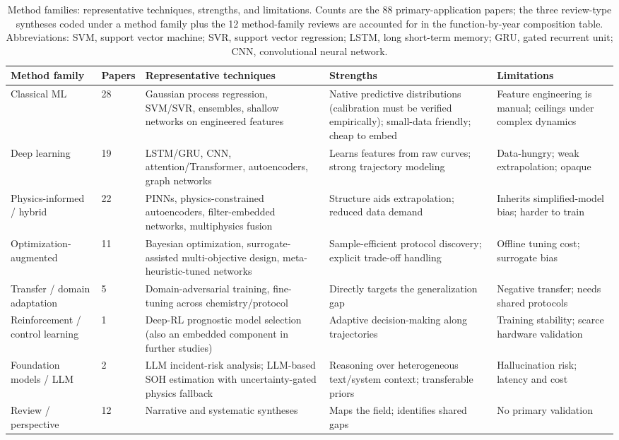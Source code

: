\documentclass[journal]{IEEEtran}
\begin{document}
\begin{table}[!t]
\caption{Method families: representative techniques, strengths, and limitations. Counts are the 88 primary-application papers; the three review-type syntheses coded under a method family plus the 12 method-family reviews are accounted for in the function-by-year composition table. Abbreviations: SVM, support vector machine; SVR, support vector regression; LSTM, long short-term memory; GRU, gated recurrent unit; CNN, convolutional neural network.}
\label{tab:TABLE_METH}
\centering
\footnotesize
\begin{tabular}{|p{0.76in}|p{0.37in}|p{1.90in}|p{1.90in}|p{1.47in}|}
\hline
\textbf{Method family} & \textbf{Papers} & \textbf{Representative techniques} & \textbf{Strengths} & \textbf{Limitations} \\
\hline
Classical ML & 28 & Gaussian process regression, SVM/SVR, ensembles, shallow networks on engineered features & Native predictive distributions (calibration must be verified empirically); small-data friendly; cheap to embed & Feature engineering is manual; ceilings under complex dynamics \\
Deep learning & 19 & LSTM/GRU, CNN, attention/Transformer, autoencoders, graph networks & Learns features from raw curves; strong trajectory modeling & Data-hungry; weak extrapolation; opaque \\
Physics-informed / hybrid & 22 & PINNs, physics-constrained autoencoders, filter-embedded networks, multiphysics fusion & Structure aids extrapolation; reduced data demand & Inherits simplified-model bias; harder to train \\
Optimization-augmented & 11 & Bayesian optimization, surrogate-assisted multi-objective design, meta-heuristic-tuned networks & Sample-efficient protocol discovery; explicit trade-off handling & Offline tuning cost; surrogate bias \\
Transfer / domain adaptation & 5 & Domain-adversarial training, fine-tuning across chemistry/protocol & Directly targets the generalization gap & Negative transfer; needs shared protocols \\
Reinforcement / control learning & 1 & Deep-RL prognostic model selection (also an embedded component in further studies) & Adaptive decision-making along trajectories & Training stability; scarce hardware validation \\
Foundation models / LLM & 2 & LLM incident-risk analysis; LLM-based SOH estimation with uncertainty-gated physics fallback & Reasoning over heterogeneous text/system context; transferable priors & Hallucination risk; latency and cost \\
Review / perspective & 12 & Narrative and systematic syntheses & Maps the field; identifies shared gaps & No primary validation \\
\hline
\end{tabular}
\end{table}
\end{document}
